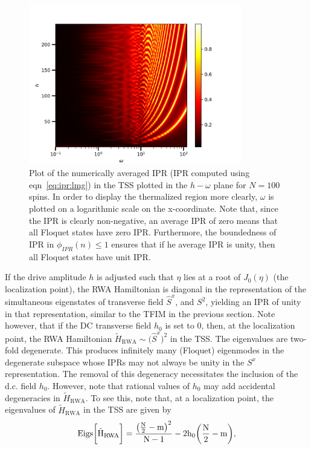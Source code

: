 \documentclass[%
reprint,
superscriptaddress,
amsmath,amssymb,
aps,
prb,
showkeys,
]{revtex4-2}
\begin{document}
	\begin{figure}[t!]
\centering
\includegraphics[width=9.3cm]{wh_phasespace.jpeg}
\caption{Plot of the numerically averaged IPR (IPR computed using eqn~\ref{eq:ipr:lmg}) in the TSS plotted in the $h-\omega$ plane for $N=100$ spins. In order to display the thermalized region more clearly, $\omega$ is plotted on a logarithmic scale on the x-coordinate. Note that, since the IPR is clearly non-negative, an average IPR of zero means that all Floquet states have zero IPR. Furthermore, the boundedness of IPR in $\phi_{IPR}(n) \leq 1$ ensures that if he average IPR is unity, then all Floquet states have unit IPR.}
\label{fig:lmg_phasediag}
\end{figure}
If the drive amplitude $h$ is adjusted such that $\eta$ lies at a root of $J_0(\eta)$ (the localization point), the RWA Hamiltonian is diagonal in the representation of the simultaneous eigenstates of transverse field $\hat{S}^x$, and $S^2$, yielding an IPR of unity in that representation, similar to the TFIM in the previous section. Note however, that if the DC transverse field $h_0$ is set to $0$, then, at the localization point, the RWA Hamiltonian $\tilde{H}_{\mathrm{RWA}}\sim
\big(\hat{S}^x\big)^2$ in the TSS. The eigenvalues are two-fold degenerate. This produces infinitely many (Floquet) eigenmodes in the degenerate subspace whose IPRs may not always be unity in the $S^x$ representation. The removal of this degeneracy necessitates the inclusion of the d.c. field $h_0$. However, note that rational values of $h_0$
may add accidental degeneracies in $\tilde{H}_{\mathrm{RWA}}$. To see this, note that, at a localization point, the eigenvalues of $\tilde{H}_{\mathrm{RWA}}$ in the TSS are given by
\begin{equation}
\rm{Eigs}\bigg[\tilde{H}_{\mathrm{RWA}}\bigg] = \frac{\big(\frac{N}{2}-m\big)^2}{N-1} - 2h_0 \bigg(\frac{N}{2}-m\bigg),
\end{equation}
\end{document}

